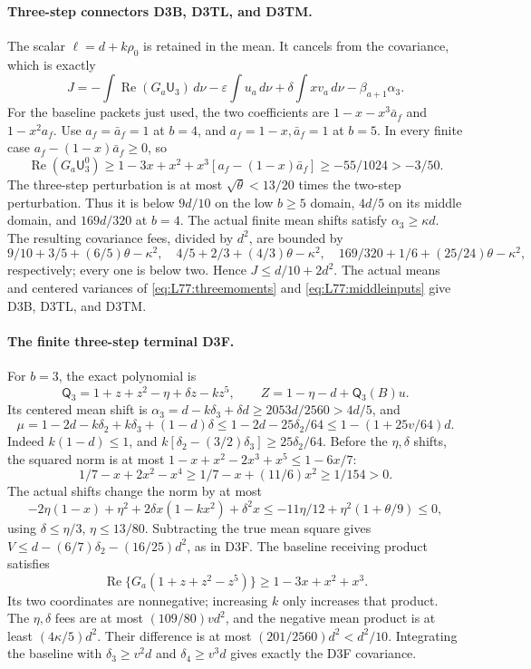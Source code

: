 \paragraph{Three-step connectors D3B, D3TL, and D3TM.}
The scalar \(\ell=d+k\rho_0\) is retained in the mean.
It cancels from the covariance, which is exactly
\[
 J=-\int\operatorname{Re}(G_a\mathsf U_3)\,d\nu
       -\varepsilon\int u_a\,d\nu
       +\delta\int xv_a\,d\nu-\beta_{a+1}\alpha_3.
\]
For the baseline packets just used, the two coefficients are
\(1-x-x^3\bar a_f\) and \(1-x^2a_f\).
Use \(a_f=\bar a_f=1\) at \(b=4\), and
\(a_f=1-x,\bar a_f=1\) at \(b=5\).
In every finite case \(a_f-(1-x)\bar a_f\ge0\), so
\[
 \operatorname{Re}(G_a\mathsf U_3^0)
 \ge1-3x+x^2+x^3[a_f-(1-x)\bar a_f]
 \ge-55/1024>-3/50.
\]
The three-step perturbation is at most \(\sqrt\theta<13/20\)
times the two-step perturbation. Thus it is below \(9d/10\)
on the low \(b\ge5\) domain, \(4d/5\) on its middle domain,
and \(169d/320\) at \(b=4\).
The actual finite mean shifts satisfy \(\alpha_3\ge\kappa d\).
The resulting covariance fees, divided by \(d^2\), are bounded by
\[
 9/10+3/5+(6/5)\theta-\kappa^2,\quad
 4/5+2/3+(4/3)\theta-\kappa^2,\quad
 169/320+1/6+(25/24)\theta-\kappa^2,
\]
respectively; every one is below two. Hence \(J\le d/10+2d^2\).
The actual means and centered variances of
\eqref{eq:L77:threemoments} and \eqref{eq:L77:middleinputs}
give D3B, D3TL, and D3TM.

\paragraph{The finite three-step terminal D3F.}
For \(b=3\), the exact polynomial is
\[
 \mathsf Q_3=1+z+z^2-\eta+\delta z-kz^5,\qquad
 Z=1-\eta-d+\mathsf Q_3(B)u.
\]
Its centered mean shift is
\(\alpha_3=d-k\delta_3+\delta d\ge2053d/2560>4d/5\), and
\[
 \mu=1-2d-k\delta_2+k\delta_3+(1-d)\delta
 \le1-2d-25\delta_2/64\le1-(1+25v/64)d.
\]
Indeed \(k(1-d)\le1\), and
\(k[\delta_2-(3/2)\delta_3]\ge25\delta_2/64\).
Before the \(\eta,\delta\) shifts, the squared norm is at most
\(1-x+x^2-2x^3+x^5\le1-6x/7\):
\[
 1/7-x+2x^2-x^4\ge1/7-x+(11/6)x^2\ge1/154>0.
\]
The actual shifts change the norm by at most
\[
 -2\eta(1-x)+\eta^2+2\delta x(1-kx^2)+\delta^2x
 \le-11\eta/12+\eta^2(1+\theta/9)\le0,
\]
using \(\delta\le\eta/3\), \(\eta\le13/80\).
Subtracting the true mean square gives
\(V\le d-(6/7)\delta_2-(16/25)d^2\), as in D3F.
The baseline receiving product satisfies
\[
 \operatorname{Re}\{G_a(1+z+z^2-z^5)\}
 \ge1-3x+x^2+x^3.
\]
Its two coordinates are nonnegative; increasing \(k\) only
increases that product. The \(\eta,\delta\) fees are at most
\((109/80)vd^2\), and the negative mean product is at least
\((4\kappa/5)d^2\). Their difference is at most
\((201/2560)d^2<d^2/10\).
Integrating the baseline with \(\delta_3\ge v^2d\) and
\(\delta_4\ge v^3d\) gives exactly the D3F covariance.

